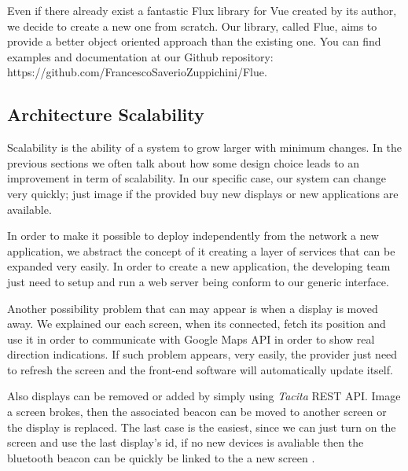 \documentclass[]{usiinfbachelorproject}
\begin{document}
Even if there already exist a fantastic Flux library for Vue created by its author, we decide to create a new one from scratch. Our library, called Flue, aims to provide a better object oriented approach than the existing one. You can find examples and documentation at our Github repository: https://github.com/FrancescoSaverioZuppichini/Flue.

\begin{figure}[H]
  \centering
\end{figure} 
\subsection{Architecture Scalability}
Scalability is the ability of a system to grow larger with minimum changes. In the previous sections we often talk about how some design choice leads to an improvement in term of scalability. In our specific case, our system can change very quickly; just image if the provided buy new displays or new applications are available.

In order to make it possible to deploy independently from the network a new application, we abstract the concept of it creating a layer of services that can be expanded very easily. In order to create a new application, the developing team just need to setup and run a web server being conform to our generic interface.

Another possibility problem that can may appear is when a display is moved away. We explained our each screen, when its connected, fetch its position and use it in order to communicate with Google Maps API in order to show real direction indications. If such problem appears, very easily, the provider just need to refresh the screen and the front-end software will automatically update itself.

Also displays can be removed or added by simply using \emph{Tacita} REST API. Image a screen brokes, then the associated beacon can be moved to another screen or the display is replaced. The last case is the easiest, since we can just turn on the screen and use the last display's id, if no new devices is avaliable then the bluetooth beacon can be quickly be linked to the a new screen . 
\end{document}
